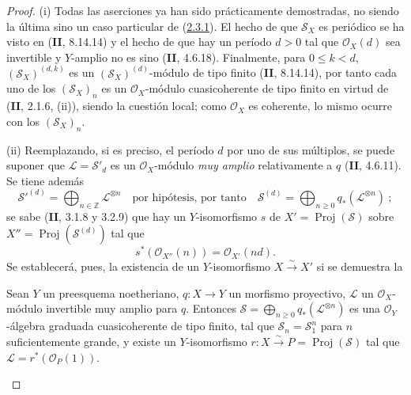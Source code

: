 \begin{proof}
(i) Todas las aserciones ya han sido prácticamente demostradas, no siendo la última sino un caso particular de (\hyperref[III.2.3.1-fr]{2.3.1}). El hecho de que $\mathcal S_X$ es periódico se ha visto en (\textbf{II}, 8.14.14) y el hecho de que hay un período $d>0$ tal que $\mathcal O_X(d)$ sea invertible y $Y$-amplio no es sino (\textbf{II}, 4.6.18). Finalmente, para $0\leq k<d$, $(\mathcal S_X)^{(d,k)}$ es un $(\mathcal S_X)^{(d)}$-módulo de tipo finito (\textbf{II}, 8.14.14), por tanto cada uno de los $(\mathcal S_X)_n$ es un $\mathcal O_X$-módulo cuasicoherente de tipo finito en virtud de (\textbf{II}, 2.1.6, (ii)), siendo la cuestión local; como $\mathcal O_X$ es coherente, lo mismo ocurre con los $(\mathcal S_X)_n$.

(ii) Reemplazando, si es preciso, el período $d$ por uno de sus múltiplos, se puede suponer que $\mathcal L=\mathcal S'_d$ es un $\mathcal O_X$-módulo \emph{muy amplio} relativamente a $q$ (\textbf{II}, 4.6.11). Se tiene además
\[
\mathcal S'^{(d)}=\bigoplus_{n\in\mathbb Z}\mathcal L^{\otimes n}
\quad\text{por hipótesis, por tanto}\quad
\mathcal S^{(d)}=\bigoplus_{n\geq0}q_*(\mathcal L^{\otimes n})~;
\]
se sabe (\textbf{II}, 3.1.8 y 3.2.9) que hay un $Y$-isomorfismo $s$ de $X'=\operatorname{Proj}(\mathcal S)$ sobre $X''=\operatorname{Proj}(\mathcal S^{(d)})$ tal que
\[
s^*(\mathcal O_{X''}(n))=\mathcal O_{X'}(nd).
\]
Se establecerá, pues, la existencia de un $Y$-isomorfismo $X\xrightarrow{\sim}X'$ si se demuestra la

\begin{proposition}[2.3.4.1]
\label{III.2.3.4.1-fr}
Sean $Y$ un preesquema noetheriano, $q:X\to Y$ un morfismo proyectivo, $\mathcal L$ un $\mathcal O_X$-módulo invertible muy amplio para $q$. Entonces $\mathcal S=\bigoplus_{n\geq0}q_*(\mathcal L^{\otimes n})$ es una $\mathcal O_Y$-álgebra graduada cuasicoherente de tipo finito, tal que $\mathcal S_n=\mathcal S_1^n$ para $n$ suficientemente grande, y existe un $Y$-isomorfismo $r:X\xrightarrow{\sim}P=\operatorname{Proj}(\mathcal S)$ tal que $\mathcal L=r^*(\mathcal O_P(1))$.
\end{proposition}


\end{proof}
